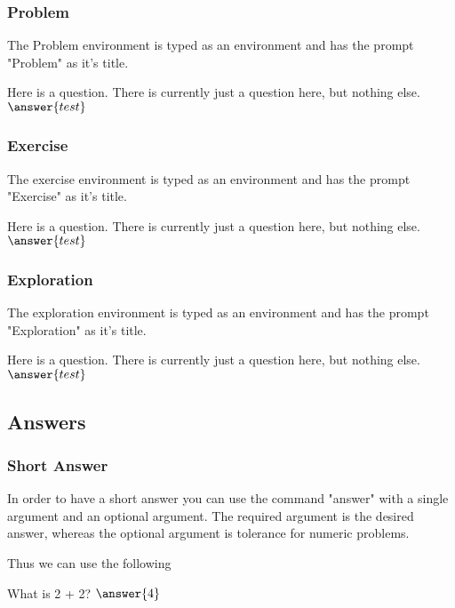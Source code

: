 \documentclass{ximera}
\begin{document}
\subsubsection{Problem}
The Problem environment is typed as an environment and has the prompt "Problem" as it's title. 

\begin{problem}
Here is a question. There is currently just a question here, but nothing else.
$\answer{test}$
\end{problem}


\subsubsection{Exercise}
The exercise environment is typed as an environment and has the prompt "Exercise" as it's title. 

\begin{exercise}
Here is a question. There is currently just a question here, but nothing else.
$\answer{test}$
\end{exercise}


\subsubsection{Exploration}
The exploration environment is typed as an environment and has the prompt "Exploration" as it's title. 

\begin{exploration}
Here is a question. There is currently just a question here, but nothing else.
$\answer{test}$
\end{exploration}

\subsection{Answers}

\subsubsection{Short Answer}
In order to have a short answer you can use the command "answer" with a single argument and an optional argument. The required argument is the desired answer, whereas the optional argument is tolerance for numeric problems.

Thus we can use the following

\begin{problem}
What is 2 + 2? 
$\answer{4}$
\end{problem}
\end{document}
